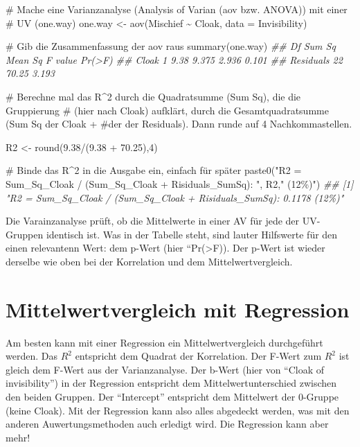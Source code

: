 \documentclass[
  10pt,
  letterpaper,
  a4paper, twoside]{scrreprt}
\newenvironment{Shaded}{\begin{snugshade}}{\end{snugshade}}
\newcommand{\AttributeTok}[1]{\textcolor[rgb]{0.40,0.45,0.13}{#1}}
\newcommand{\CommentTok}[1]{\textcolor[rgb]{0.37,0.37,0.37}{#1}}
\newcommand{\DecValTok}[1]{\textcolor[rgb]{0.68,0.00,0.00}{#1}}
\newcommand{\DocumentationTok}[1]{\textcolor[rgb]{0.37,0.37,0.37}{\textit{#1}}}
\newcommand{\FloatTok}[1]{\textcolor[rgb]{0.68,0.00,0.00}{#1}}
\newcommand{\FunctionTok}[1]{\textcolor[rgb]{0.28,0.35,0.67}{#1}}
\newcommand{\NormalTok}[1]{\textcolor[rgb]{0.00,0.23,0.31}{#1}}
\newcommand{\OtherTok}[1]{\textcolor[rgb]{0.00,0.23,0.31}{#1}}
\newcommand{\SpecialCharTok}[1]{\textcolor[rgb]{0.37,0.37,0.37}{#1}}
\newcommand{\StringTok}[1]{\textcolor[rgb]{0.13,0.47,0.30}{#1}}
\begin{document}
\begin{Shaded}
\begin{Highlighting}[]

\CommentTok{\# Mache eine Varianzanalyse (Analysis of Varian (aov bzw. ANOVA)) mit einer}
\CommentTok{\# UV (one.way)}
\NormalTok{one.way }\OtherTok{\textless{}{-}} \FunctionTok{aov}\NormalTok{(Mischief }\SpecialCharTok{\textasciitilde{}}\NormalTok{ Cloak, }\AttributeTok{data =}\NormalTok{ Invisibility)}

\CommentTok{\# Gib die Zusammenfassung der aov raus}
\FunctionTok{summary}\NormalTok{(one.way)}
\DocumentationTok{\#\#             Df Sum Sq Mean Sq F value Pr(\textgreater{}F)}
\DocumentationTok{\#\# Cloak        1   9.38   9.375   2.936  0.101}
\DocumentationTok{\#\# Residuals   22  70.25   3.193}

\CommentTok{\# Berechne mal das R\^{}2 durch die Quadratsumme (Sum Sq), die die Gruppierung}
\CommentTok{\# (hier nach Cloak) aufklärt, durch die Gesamtquadratsumme (Sum Sq der Cloak + }
\CommentTok{\#der der Residuals). Dann runde auf 4 Nachkommastellen.}

\NormalTok{R2 }\OtherTok{\textless{}{-}} \FunctionTok{round}\NormalTok{(}\FloatTok{9.38}\SpecialCharTok{/}\NormalTok{(}\FloatTok{9.38} \SpecialCharTok{+} \FloatTok{70.25}\NormalTok{),}\DecValTok{4}\NormalTok{)}

\CommentTok{\# Binde das R\^{}2 in die Ausgabe ein, einfach für später}
\FunctionTok{paste0}\NormalTok{(}\StringTok{"R2 = Sum\_Sq\_Cloak / (Sum\_Sq\_Cloak + Risiduals\_SumSq): "}\NormalTok{, R2,}\StringTok{" (12\%)"}\NormalTok{)}
\DocumentationTok{\#\# [1] "R2 = Sum\_Sq\_Cloak / (Sum\_Sq\_Cloak + Risiduals\_SumSq): 0.1178 (12\%)"}
\end{Highlighting}
\end{Shaded}

Die Varainzanalyse prüft, ob die Mittelwerte in einer AV für jede der
UV-Gruppen identisch ist. Was in der Tabelle steht, sind lauter
Hilfswerte für den einen relevantenn Wert: dem p-Wert (hier
``Pr(\textgreater F)). Der p-Wert ist wieder derselbe wie oben bei der
Korrelation und dem Mittelwertvergleich.

\section{Mittelwertvergleich mit
Regression}\label{mittelwertvergleich-mit-regression}

Am besten kann mit einer Regression ein Mittelwertvergleich durchgeführt
werden. Das \(R^2\) entspricht dem Quadrat der Korrelation. Der F-Wert
zum \(R^2\) ist gleich dem F-Wert aus der Varianzanalyse. Der b-Wert
(hier von \enquote{Cloak of invisibility}) in der Regression entspricht
dem Mittelwertunterschied zwischen den beiden Gruppen. Der
\enquote{Intercept} entspricht dem Mittelwert der 0-Gruppe (keine
Cloak). Mit der Regression kann also alles abgedeckt werden, was mit den
anderen Auwertungsmethoden auch erledigt wird. Die Regression kann aber
mehr!
\end{document}
